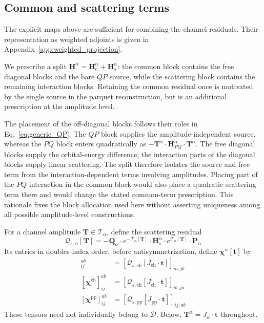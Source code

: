 \documentclass[aip,jcp,reprint,noshowkeys,superscriptaddress]{revtex4-1}
\newcommand{\eh}{\text{eh}}
\newcommand{\teh}{{\overline{\text{eh}}}}
\newcommand{\pp}{\text{pp}}
\newcommand{\bt}{\boldsymbol{t}}
\newcommand{\bT}{\boldsymbol{T}}
\newcommand{\bH}{\boldsymbol{H}}
\newcommand{\bP}{\boldsymbol{P}}
\newcommand{\bQ}{\boldsymbol{Q}}
\newcommand{\bchi}{\boldsymbol{\chi}}
\newcommand{\bcalT}{\boldsymbol{\mathcal{T}}}
\newcommand{\bcalQ}{\boldsymbol{\mathcal{Q}}}
\begin{document}
\subsection{Common and scattering terms}
\label{sec:source_scattering}

The explicit maps above are sufficient for combining the channel residuals.
Their representation as weighted adjoints is given in
Appendix~\ref{app:weighted_projection}.

We prescribe a split $\bH^{\alpha}=\bH_c^{\alpha}+\bH_s^{\alpha}$: the common block
contains the free diagonal blocks and the bare $QP$ source, while the
scattering block contains the remaining interaction blocks. Retaining the
common residual once is motivated by the single source in the parquet
reconstruction, but is an additional prescription at the amplitude level.

The placement of the off-diagonal blocks follows their roles in
Eq.~\eqref{eq:generic_QP}. The $QP$ block supplies the amplitude-independent
source, whereas the $PQ$ block enters quadratically as
$-\bT^{\alpha}\cdot\bH_{PQ}^{\alpha}\cdot\bT^{\alpha}$. The free diagonal blocks supply the
orbital-energy difference; the interaction parts of the diagonal blocks
supply linear scattering. The split therefore isolates the source and free
term from the interaction-dependent terms involving amplitudes. Placing part
of the $PQ$ interaction in the common block would also place a quadratic
scattering term there and would change the stated common-term prescription.
This rationale fixes the block allocation used here without asserting
uniqueness among all possible amplitude-level constructions.

For a channel amplitude $\bT\in\mathscr T_{\alpha}$, define the scattering residual
\begin{equation}
 \bcalQ_{s,\alpha}[\bT]
 =-\bQ_{\alpha}\cdot e^{-\bcalT_{\alpha}[\bT]}\cdot\bH_s^{\alpha}
 \cdot e^{\bcalT_{\alpha}[\bT]}\cdot\bP_{\alpha}
 \label{eq:channel_scattering_residual}
\end{equation}
Its entries in doubles-index order, before antisymmetrization, define
$\bchi^{\alpha}[\bt]$ by
\begin{align}
 [\bchi^{\eh}]_{ij}^{ab}
 &=[\bcalQ_{s,\eh}[J_{\eh}\cdot\bt]]_{ia,jb}
 \\
 [\bchi^{\teh}]_{ij}^{ab}
 &=[\bcalQ_{s,\teh}[J_{\teh}\cdot\bt]]_{ib,ja}
 \\
 [\bchi^{\pp}]_{ij}^{ab}
 &=[\bcalQ_{s,\pp}[J_{\pp}\cdot\bt]]_{ij,ab}
 \label{eq:raw_channel_contributions}
\end{align}
These tensors need not individually belong to $\mathscr D$. Below,
$\bT^{\alpha}=J_{\alpha}\cdot\bt$ throughout.
\end{document}
